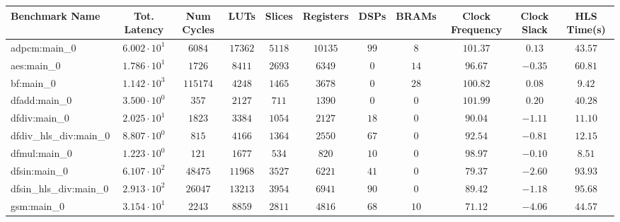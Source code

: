 \begin{tabular}{|l|c|c|c|c|c|c|c|c|c|c|}
\hline
Benchmark Name          & Tot. Latency           & Num Cycles & LUTs       & Slices    & Registers & DSPs    & BRAMs   & Clock Frequency & Clock Slack & HLS Time(s) \\
\hline
adpcm:main\_0           & $ 6.002 \cdot 10^{1} $ & $ 6084   $ & $ 17362  $ & $ 5118  $ & $ 10135 $ & $ 99  $ & $ 8   $ & $ 101.37      $ & $ 0.13    $ & $ 43.57   $ \\
aes:main\_0             & $ 1.786 \cdot 10^{1} $ & $ 1726   $ & $ 8411   $ & $ 2693  $ & $ 6349  $ & $ 0   $ & $ 14  $ & $ 96.67       $ & $ -0.35   $ & $ 60.81   $ \\
bf:main\_0              & $ 1.142 \cdot 10^{3} $ & $ 115174 $ & $ 4248   $ & $ 1465  $ & $ 3678  $ & $ 0   $ & $ 28  $ & $ 100.82      $ & $ 0.08    $ & $ 9.42    $ \\
dfadd:main\_0           & $ 3.500 \cdot 10^{0} $ & $ 357    $ & $ 2127   $ & $ 711   $ & $ 1390  $ & $ 0   $ & $ 0   $ & $ 101.99      $ & $ 0.20    $ & $ 40.28   $ \\
dfdiv:main\_0           & $ 2.025 \cdot 10^{1} $ & $ 1823   $ & $ 3384   $ & $ 1054  $ & $ 2127  $ & $ 18  $ & $ 0   $ & $ 90.04       $ & $ -1.11   $ & $ 11.10   $ \\
dfdiv\_hls\_div:main\_0 & $ 8.807 \cdot 10^{0} $ & $ 815    $ & $ 4166   $ & $ 1364  $ & $ 2550  $ & $ 67  $ & $ 0   $ & $ 92.54       $ & $ -0.81   $ & $ 12.15   $ \\
dfmul:main\_0           & $ 1.223 \cdot 10^{0} $ & $ 121    $ & $ 1677   $ & $ 534   $ & $ 820   $ & $ 10  $ & $ 0   $ & $ 98.97       $ & $ -0.10   $ & $ 8.51    $ \\
dfsin:main\_0           & $ 6.107 \cdot 10^{2} $ & $ 48475  $ & $ 11968  $ & $ 3527  $ & $ 6221  $ & $ 41  $ & $ 0   $ & $ 79.37       $ & $ -2.60   $ & $ 93.93   $ \\
dfsin\_hls\_div:main\_0 & $ 2.913 \cdot 10^{2} $ & $ 26047  $ & $ 13213  $ & $ 3954  $ & $ 6941  $ & $ 90  $ & $ 0   $ & $ 89.42       $ & $ -1.18   $ & $ 95.68   $ \\
gsm:main\_0             & $ 3.154 \cdot 10^{1} $ & $ 2243   $ & $ 8859   $ & $ 2811  $ & $ 4816  $ & $ 68  $ & $ 10  $ & $ 71.12       $ & $ -4.06   $ & $ 44.57   $ \\

\end{tabular}
